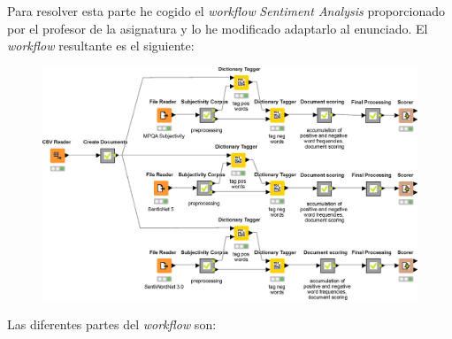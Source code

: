 \documentclass[11pt]{article}
\begin{document}
Para resolver esta parte he cogido el \textit{workflow} \textit{Sentiment Analysis} proporcionado por el profesor de la asignatura y lo he modificado adaptarlo al enunciado. El \textit{workflow} resultante es el siguiente:

\begin{figure}[H]
	\centering
	\includegraphics[width=\linewidth]{images/analysis_wf.eps}
\end{figure}

Las diferentes partes del \textit{workflow} son:
\end{document}
